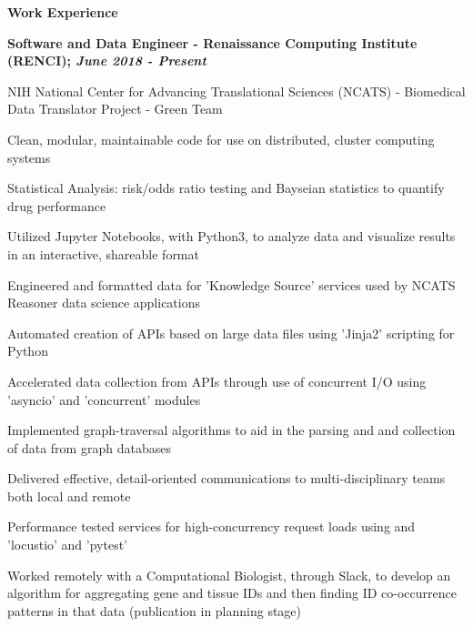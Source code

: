 \documentclass[letterpaper,final]{memoir}
\newcommand{\Sep}{\vspace{1.0em}}
\newcommand{\SmallSep}{\vspace{0.4em}}
\newcommand{\CVSection}[1]
	{\LARGE\textbf{#1}\par
	\SmallSep\normalsize}
\newcommand{\CVItem}[1]
	{\textbf{\color{Blue} #1}}
\begin{document}

\notoserif \CVSection{Work Experience}
\normalfont

\Sep

\CVItem{Software and Data Engineer - Renaissance Computing Institute (RENCI); \textit{June 2018 - Present}}
\begin{compactitem}[\color{Blue}$\circ$]
    \SmallSep
    \item NIH National Center for Advancing Translational Sciences (NCATS) - Biomedical Data Translator Project - Green Team
    \SmallSep
    \item Clean, modular, maintainable code for use on distributed, cluster computing systems
    \SmallSep
    \item Statistical Analysis: risk/odds ratio testing and Bayseian statistics to quantify drug performance
    \SmallSep
    \item Utilized Jupyter Notebooks, with Python3, to analyze data and visualize results in an interactive, shareable format
    \SmallSep
    \item Engineered and formatted data for 'Knowledge Source' services used by NCATS Reasoner data science applications
    \SmallSep
    \item Automated creation of APIs based on large data files using 'Jinja2' scripting for Python
    \SmallSep
    \item Accelerated data collection from APIs through use of concurrent I/O using 'asyncio' and 'concurrent' modules
    \SmallSep
    \item Implemented graph-traversal algorithms to aid in the parsing and and collection of data from graph databases
    \SmallSep
    \item Delivered effective, detail-oriented communications to multi-disciplinary teams both local and remote
    \SmallSep
    \item Performance tested services for high-concurrency request loads using and 'locustio' and 'pytest'
    \SmallSep
    \item Worked remotely with a Computational Biologist, through Slack, to develop an algorithm for 
    aggregating gene and tissue IDs and then finding ID co-occurrence patterns in that data (publication in planning stage)

\end{compactitem}

\Sep
\end{document}
